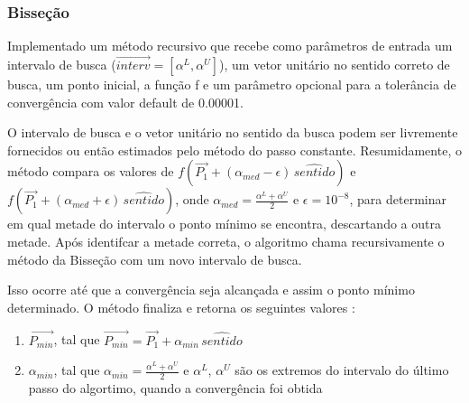 \documentclass[10pt, a4paper]{article}
\begin{document}
\subsubsection{Bisseção}
Implementado um método recursivo que recebe como parâmetros de entrada um intervalo de busca
($\overrightarrow{interv} = [\alpha^L, \alpha^U]$), um vetor unitário no sentido correto
de busca, um ponto inicial, a função f e um parâmetro opcional para a tolerância de convergência com valor default de 0.00001.

O intervalo de busca e o vetor unitário no sentido da busca podem ser livremente fornecidos ou então estimados
pelo método do passo constante. Resumidamente, o método compara os valores de 
$f(\overrightarrow{P_1} + (\alpha_{med}- \epsilon)\,\hat{sentido})$ e $f(\overrightarrow{P_1} + (\alpha_{med}+ \epsilon)\,\hat{sentido})$,
onde $\alpha_{med} = \frac{\alpha^L + \alpha^U}{2}$ e $\epsilon = 10^{-8}$, para determinar em qual metade do intervalo
o ponto mínimo se encontra, descartando a outra metade. Após identifcar a metade correta, o algoritmo
chama recursivamente o método da Bisseção com um novo intervalo de busca.
 
Isso ocorre até que a convergência seja alcançada e assim o ponto mínimo determinado. O método finaliza e 
retorna os seguintes valores :

\begin{enumerate}
  \item $\overrightarrow{P_{min}}$, tal que $\overrightarrow{P_{min}} = \overrightarrow{P_1} + \alpha_{min}\,\hat{sentido}$
  \item $\alpha_{min}$, tal que $\alpha_{min} = \frac{\alpha^L + \alpha^U}{2}$ e $\alpha^L$, $\alpha^U$ são os extremos do
  intervalo do último passo do algortimo, quando a convergência foi obtida
\end{enumerate} 
\end{document}
